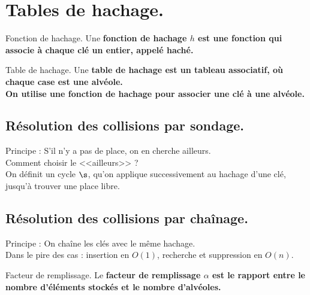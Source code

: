 \documentclass[french, 11pt]{article}
\begin{document}
\section{Tables de hachage.}

\begin{defi}{Fonction de hachage.}{}
    Une \bf{fonction de hachage} $h$ est une fonction qui associe à chaque clé un entier, appelé \bf{haché}.
\end{defi}

\begin{defi}{Table de hachage.}{}
    Une \bf{table de hachage} est un tableau associatif, où chaque case est une alvéole.\\
    On utilise une fonction de hachage pour associer une clé à une alvéole.
\end{defi}

\subsection{Résolution des collisions par sondage.}

\begin{defi}{}{}
    Principe : S'il n'y a pas de place, on en cherche ailleurs.\\
    Comment choisir le <<ailleurs>> ?\\
    On définit un cycle $\s$, qu'on applique successivement au hachage d'une clé, jusqu'à trouver une place libre.
\end{defi}

\subsection{Résolution des collisions par chaînage.}

\begin{defi}{}{}
    Principe : On chaîne les clés avec le même hachage.\\
    Dans le pire des cas : insertion en $O(1)$, recherche et suppression en $O(n)$.
\end{defi}

\begin{defi}{Facteur de remplissage.}{}
    Le \bf{facteur de remplissage} $\alpha$ est le rapport entre le nombre d'éléments stockés et le nombre d'alvéoles.
\end{defi}
\end{document}
